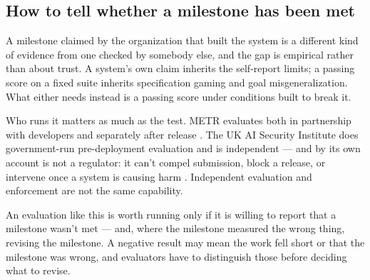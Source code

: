\subsection{How to tell whether a milestone has been met}
\label{sec:27.1.2}
A milestone claimed by the organization that built the system is a different kind of evidence from one checked by somebody else, and the gap is empirical rather than about trust. A system's own claim inherits the self-report limits; a passing score on a fixed suite inherits specification gaming and goal misgeneralization. What either needs instead is a passing score under conditions built to break it.

Who runs it matters as much as the test. METR evaluates both in partnership with developers and separately after release \autocite{metr2026about}. The UK AI Security Institute does government-run pre-deployment evaluation and is independent — and by its own account is not a regulator: it can't compel submission, block a release, or intervene once a system is causing harm \autocite{aisi2025governance}. Independent evaluation and enforcement are not the same capability.

An evaluation like this is worth running only if it is willing to report that a milestone wasn't met — and, where the milestone measured the wrong thing, revising the milestone. A negative result may mean the work fell short or that the milestone was wrong, and evaluators have to distinguish those before deciding what to revise.
